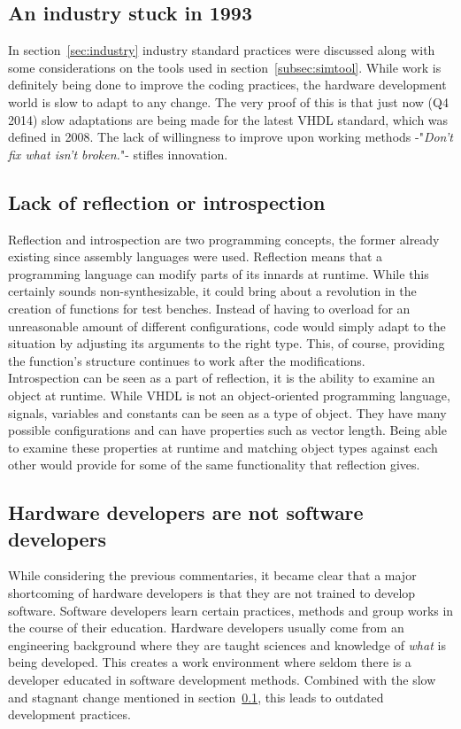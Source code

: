 \documentclass[11pt,british]{article}
\begin{document}
\subsection{An industry stuck in 1993}
\label{subsec:stuck}
In section~\ref{sec:industry} industry standard practices were discussed along with some considerations on the tools used in section~\ref{subsec:simtool}. While work is definitely being done to improve the coding practices, the hardware development world is slow to adapt to any change. The very proof of this is that just now (Q4 2014) slow adaptations are being made for the latest VHDL standard, which was defined in 2008. The lack of willingness to improve upon working methods -"\emph{Don't fix what isn't broken.}"- stifles innovation. 

\subsection{Lack of reflection or introspection}
Reflection and introspection are two programming concepts, the former already existing since assembly languages were used. Reflection means that a programming language can modify parts of its innards at runtime. While this certainly sounds non-synthesizable, it could bring about a revolution in the creation of functions for test benches. Instead of having to overload for an unreasonable amount of different configurations, code would simply adapt to the situation by adjusting its arguments to the right type. This, of course, providing the function's structure  continues to work after the modifications.
\\[\baselineskip]
Introspection can be seen as a part of reflection, it is the ability to examine an object at runtime. While VHDL is not an object-oriented programming language, signals, variables and constants can be seen as a type of object. They have many possible configurations and can have  properties such as vector length. Being able to examine these properties at runtime and matching object types against each other would provide for some of the same functionality that reflection gives.

\subsection{Hardware developers are not software developers}
While considering the previous commentaries, it became clear that a major shortcoming of hardware developers is that they are not trained to develop software. Software developers learn certain practices, methods and group works in the course of their education. Hardware developers usually come from an engineering background where  they are taught sciences and knowledge of \emph{what} is being developed. This creates a work environment where seldom there is a developer educated in software development methods. Combined with the slow and stagnant change mentioned in section~\ref{subsec:stuck}, this leads to outdated development practices.
\end{document}
